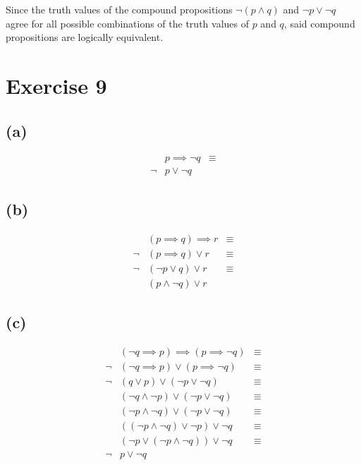 \documentclass{article}
\begin{document}
Since the truth values of the compound propositions $\neg (p \land q)$ and $\neg p \lor \neg q$ agree for all possible combinations of the truth values of $p$ and $q$, said compound propositions are logically equivalent.

\pagebreak

\section{Exercise 9}

\subsection{(a)}
\begin{align*}
	     & p \implies \neg q & \equiv \\
	\neg & p \lor \neg q
\end{align*}

\subsection{(b)}
\begin{align*}
	     & (p \implies q) \implies r & \equiv \\
	\neg & (p \implies q) \lor r     & \equiv \\
	\neg & (\neg p \lor q) \lor r    & \equiv \\
	     & (p \land \neg q) \lor r
\end{align*}

\subsection{(c)}
\begin{align*}
	     & (\neg q \implies p) \implies (p \implies \neg q) & \equiv \\
	\neg & (\neg q \implies p) \lor (p \implies \neg q)     & \equiv \\
	\neg & (q \lor p) \lor (\neg p \lor \neg q)             & \equiv \\
	     & (\neg q \land \neg p) \lor (\neg p \lor \neg q)  & \equiv \\
	     & (\neg p \land \neg q) \lor (\neg p \lor \neg q)  & \equiv \\
	     & ((\neg p \land \neg q) \lor \neg p) \lor \neg q  & \equiv \\
	     & (\neg p \lor (\neg p \land \neg q)) \lor \neg q  & \equiv \\
	\neg & p \lor \neg q
\end{align*}
\end{document}
